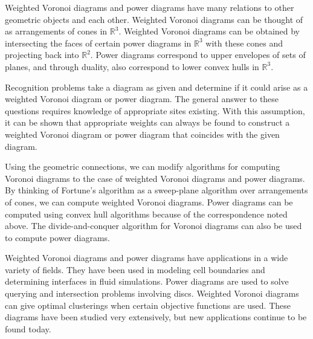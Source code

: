 \documentclass[a4paper, 11pt]{article}
\newcommand{\R}{\mathbb{R}}
\begin{document}
Weighted Voronoi diagrams and power diagrams have many relations to other geometric objects and each other. Weighted Voronoi diagrams can be thought
of as arrangements of cones in $\R^3$. Weighted Voronoi diagrams can be obtained
by intersecting the faces of certain power diagrams in $\R^3$ with these cones and projecting back into $\R^2$. Power diagrams correspond to upper
envelopes of sets of planes, and through duality, also correspond to lower convex hulls in $\R^3$.

Recognition problems take a diagram as given and determine if it could arise as a weighted Voronoi diagram or power diagram. The general answer to
these questions requires knowledge of appropriate sites existing. With this assumption, it can be shown that appropriate weights can always be found
to construct a weighted Voronoi diagram or power diagram that coincides with the given diagram.

Using the geometric connections, we can modify algorithms for computing Voronoi diagrams to the case of weighted Voronoi diagrams and power
diagrams. By thinking of Fortune's algorithm as a sweep-plane algorithm over arrangements of cones, we can compute weighted Voronoi diagrams. Power
diagrams can be computed using convex hull algorithms because of the correspondence noted above. The divide-and-conquer algorithm for Voronoi diagrams
can also be used to compute power diagrams.

Weighted Voronoi diagrams and power diagrams have applications in a wide variety of fields. They have been used in modeling cell boundaries and
determining interfaces in fluid simulations. Power diagrams are used to solve querying and intersection problems involving discs. Weighted Voronoi
diagrams can give optimal clusterings when certain objective functions are used. These diagrams have been studied very extensively, but new
applications continue to be found today.

\printbibliography
\end{document}
